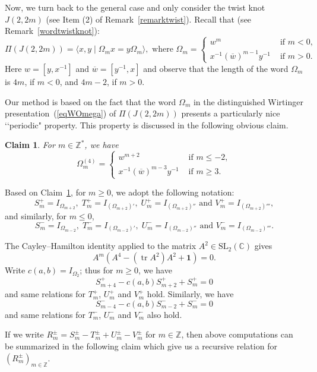 \documentclass[a4paper]{amsart}
\theoremstyle{plain}
\newtheorem{claim}[theorem]{Claim}
\theoremstyle{definition}
\theoremstyle{remark}
\newcommand{\ZZ}{{\mathbb Z}}
\newcommand{\C}{{\mathbb C}}
\newcommand{\I}{\mathbf{1}}
\newcommand{\SL}{{\mathrm{SL}_2(\C)}}
\newcommand{\tr}{\mathop{\mathrm{tr}}\nolimits}
\begin{document}
Now, we turn back to the general case and only consider the twist knot $J(2, 2m)$ (see Item (2) of Remark~\ref{remarktwist}). Recall that (see Remark~\ref{wordtwistknot}):
\begin{equation}\label{eqWOmega}
\Pi(J(2, 2m)) = \langle x, y \; |\; \Omega_m x = y \Omega_m \rangle, \text{ where } \Omega_m = \begin{cases}
     w^m & \text{ if } m < 0, \\
      x^{-1} {(\overline{w})}^{m-1} y^{-1} & \text{ if } m > 0.
      \end{cases}
\end{equation}
Here $w=[y,x^{-1}]$ and $\overline{w} = [y^{-1}, x]$ and observe that the length of the word $\Omega_m$ is $4m$, if $m < 0$, and $4m-2$, if $m>0$. 

Our method is based on the fact that the word $\Omega_m$ in the distinguished Wirtinger presentation~(\ref{eqWOmega}) of $\Pi(J(2, 2m))$ presents a particularly nice \lq\lq periodic" property. This property is discussed in the following obvious claim.

\begin{claim}\label{claimOmega}
For $m \in \ZZ^*$, we have
\[
    \Omega_{m}^{(4)} = \begin{cases}
    w^{m+2}  & \text{ if } m\leqslant -2,\\
     x^{-1} {(\overline{w})}^{m-3}y^{-1} & \text{ if } m \geqslant 3.
\end{cases}
\]
\end{claim}

Based on Claim~\ref{claimOmega}, for $m \geqslant 0$, we adopt the following notation:
$$S^+_m=I_{\Omega_{m+2}}, \; T^+_m=I_{{(\Omega_{m+2})}'},\; U^+_m=I_{{(\Omega_{m+2})}''}  \text{ and } V^+_m=I_{{(\Omega_{m+2})}'''},$$
and similarly, for $m\leqslant 0$,
$$S^-_{m}=I_{\Omega_{m-2}}, \; T^-_{m}=I_{{(\Omega_{m-2})}'},\; U^-_{m}=I_{{(\Omega_{m-2})}''}  \text{ and } V^-_{m}=I_{{(\Omega_{m-2})}'''}.$$

The Cayley--Hamilton identity applied to the matrix $A^2 \in \SL$ gives$$A^m \left(A^{4}-(\tr A^2)A^{2}+\I\right)=0.$$ 
Write $c(a,b)=I_{\Omega_2}$; thus for $m\geqslant 0$, we have
$$S^+_{m+4} - c(a,b) S^+_{m+2} + S^+_m =0$$ and same relations for $T^+_m$, $U^+_m$ and $V^+_m$ hold. Similarly, we have
$$S^-_{m-4} - c(a,b) S^-_{m-2} + S^-_m =0$$ and same relations for $T^-_m$, $U^-_m$ and $V^-_m$ also hold.


If we write $R^{\pm}_m=S^{\pm}_m-T^{\pm}_m+U^{\pm}_m-V^{\pm}_m$ for $m \in \ZZ$, then above computations can be summarized in the following claim which give us a recursive relation for ${(R^{\pm}_m)}_{m \in \ZZ}$.
\end{document}
